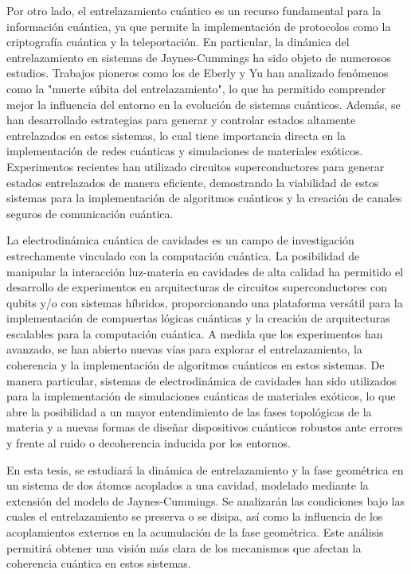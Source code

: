 Por otro lado, el entrelazamiento cuántico es un recurso fundamental para la información cuántica, ya que permite la implementación de protocolos como la criptografía cuántica y la teleportación. En particular, la dinámica del entrelazamiento en sistemas de Jaynes-Cummings ha sido objeto de numerosos estudios. Trabajos pioneros como los de Eberly y Yu \cite{Yu2009} han analizado fenómenos como la "muerte súbita del entrelazamiento", lo que ha permitido comprender mejor la influencia del entorno en la evolución de sistemas cuánticos. Además, se han desarrollado estrategias para generar y controlar estados altamente entrelazados en estos sistemas, lo cual tiene importancia directa en la implementación de redes cuánticas y simulaciones de materiales exóticos. Experimentos recientes han utilizado circuitos superconductores para generar estados entrelazados de manera eficiente, demostrando la viabilidad de estos sistemas para la implementación de algoritmos cuánticos y la creación de canales seguros de comunicación cuántica.

La electrodinámica cuántica de cavidades es un campo de investigación estrechamente vinculado con la computación cuántica. La posibilidad de manipular la interacción luz-materia en cavidades de alta calidad ha permitido el desarrollo de experimentos en arquitecturas de circuitos superconductores con qubits y/o con sistemas híbridos, proporcionando una plataforma versátil para la implementación de compuertas lógicas cuánticas y la creación de arquitecturas escalables para la computación cuántica. A medida que los experimentos han avanzado, se han abierto nuevas vías para explorar el entrelazamiento, la coherencia y la implementación de algoritmos cuánticos en estos sistemas. De manera particular, sistemas de electrodinámica de cavidades han sido utilizados para la implementación de simulaciones cuánticas de materiales exóticos, lo que abre la posibilidad a un mayor entendimiento de las fases topológicas de la materia y a nuevas formas de diseñar dispositivos cuánticos robustos ante errores y frente al ruido o decoherencia inducida por los entornos.

En esta tesis, se estudiará la dinámica de entrelazamiento y la fase geométrica en un sistema de dos átomos acoplados a una cavidad, modelado mediante la extensión del modelo de Jaynes-Cummings. Se analizarán las condiciones bajo las cuales el entrelazamiento se preserva o se disipa, así como la influencia de los acoplamientos externos en la acumulación de la fase geométrica. Este análisis permitirá obtener una visión más clara de los mecanismos que afectan la coherencia cuántica en estos sistemas.

